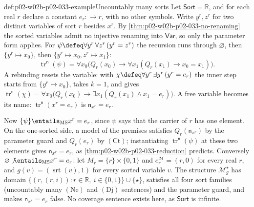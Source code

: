 \begin{hbexample}{def:p02-w02b-p02-033-example}{Uncountably many sorts}
Let \(\mathsf{Sort}=\mathbb R\), and for each real \(r\) declare a constant
\(e_r:\longrightarrow r\), with no other symbols.  Write \(y^r,z^r\) for two
distinct variables of sort \(r\) besides \(x^r\).  By
\cref{thm:p02-w02b-p02-033-no-renaming} the sorted variables admit no
injective renaming into \(\mathsf{Var}\), so only the parameter form applies.
For \(\psi\defeq\forall y^r\,\forall z^r\,(y^r=z^r)\) the recursion runs
through \(\varnothing\), then \(\{y^r\mapsto x_0\}\), then
\(\{y^r\mapsto x_0,z^r\mapsto x_1\}\):
\[
 \operatorname{tr}^{\mathsf n}(\psi)=
 \forall x_0\bigl(Q_r(x_0)\to\forall x_1(Q_r(x_1)\to x_0=x_1)\bigr).
\]
A rebinding resets the variable: with
\(\chi\defeq\forall y^r\,\exists y^r\,(y^r=e_r)\) the inner step starts from
\(\{y^r\mapsto x_0\}\), takes \(k=1\), and gives
\(\operatorname{tr}^{\mathsf n}(\chi)=\forall x_0\bigl(Q_r(x_0)\to
\exists x_1(Q_r(x_1)\land x_1=e_r)\bigr)\).  A free variable becomes its
name: \(\operatorname{tr}^{\mathsf n}(x^r=e_r)\) is
\(\mathsf n_{x^r}=e_r\).

Now \(\{\psi\}\entails_{\mathrm{MS}}x^r=e_r\), since \(\psi\) says that the
carrier of \(r\) has one element.  On the one-sorted side, a model of the
premises satisfies \(Q_r(\mathsf n_{x^r})\) by the parameter guard and
\(Q_r(e_r)\) by \((\mathrm{Ct})\); instantiating
\(\operatorname{tr}^{\mathsf n}(\psi)\) at these two elements gives
\(\mathsf n_{x^r}=e_r\), as \cref{thm:p02-w02b-p02-033-reduction} predicts.
Conversely \(\varnothing\not\entails_{\mathrm{MS}}x^r=e_r\): let
\(M_r=\{r\}\times\{0,1\}\) and \(e_r^{\mathcal M}=(r,0)\) for every real
\(r\), and \(g(v)=(\operatorname{srt}(v),1)\) for every sorted variable
\(v\).  The structure \(\mathcal M^{\star}_{g}\) has domain
\(\{(r,(r,i)):r\in\mathbb R,\ i\in\{0,1\}\}\cup\{\star\}\), satisfies all four
sort families (uncountably many \((\mathrm{Ne})\) and \((\mathrm{Dj})\)
sentences) and the parameter guard, and makes
\(\mathsf n_{x^r}=e_r\) false.  No coverage sentence exists here, as
\(\mathsf{Sort}\) is infinite.
\end{hbexample}

